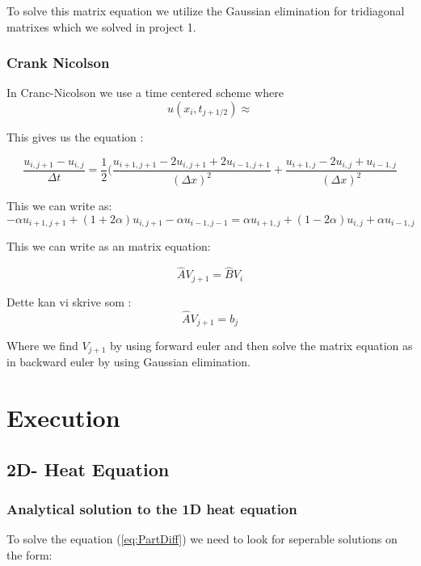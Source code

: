 \documentclass[a4paper,10pt]{article}
\begin{document}
To solve this matrix equation we utilize the Gaussian elimination for tridiagonal matrixes which we solved in project 1.


\subsubsection{Crank Nicolson}
In Cranc-Nicolson we use a time centered scheme where 
\begin{equation}
u(x_i, t_{j+1/2}) \approx 
\end{equation}

This gives us the equation :

\begin{equation}
 \frac{u_{i,j+1} - u_{i,j}}{\Delta t} = \frac{1}{2}(\frac{u_{i+1,j+1} - 2u_{i,j+1} + 2u_{i-1,j+1}}{(\Delta x)^2} + \frac{u_{i+1,j} - 2u_{i,j}+u_{i-1,j}}{(\Delta x)^2}
\end{equation}

This we can write as:
\begin{equation}
 -\alpha u_{i+1,j+1} + (1+2\alpha)u_{i,j+1} - \alpha u_{i-1,j-1} =  \alpha u_{i+1,j} + (1-2\alpha)u_{i,j} + \alpha u_{i-1,j}

\end{equation}

This we can write as an matrix equation:

\begin{equation}
 \hat{A}V_{j+1} = \hat{B}V_{i}
\end{equation}

Dette kan vi skrive som :
\begin{equation}
 \hat{A}V_{j+1} = b_{j}
\end{equation}

Where we find $V_{j+1}$ by using forward euler and then solve the matrix equation as in backward euler by using Gaussian elimination. 

\section{Execution}
\subsection{2D- Heat Equation}
\subsubsection{Analytical solution to the 1D heat equation}
To solve the equation (\ref{eq:PartDiff}) we need to look for seperable solutions on the form:
\end{document}

